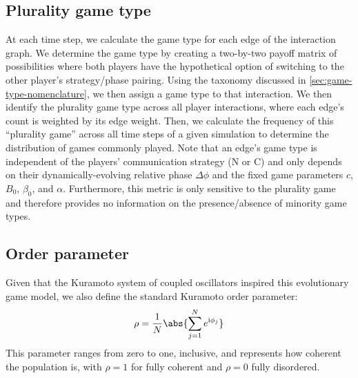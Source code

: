\documentclass[pdflatex,lineno,referee,sn-nature]{sn-jnl}
\begin{document}
\subsection{Plurality game type}\label{sec:plurality_game_type}
At each time step, we calculate the game type for each edge
of the interaction graph.
We determine the game type by creating a two-by-two payoff matrix of possibilities
where both players have the hypothetical option of switching to the other player's
strategy/phase pairing.
Using the taxonomy discussed in \cref{sec:game-type-nomenclature},
we then assign a game type to that interaction.
We then identify the plurality game type across all player interactions,
where each edge's count is weighted by its edge weight.
Then, we calculate the frequency of this ``plurality game'' across
all time steps of a given simulation to determine the distribution
of games commonly played.
Note that an edge's game type is independent
of the players' communication strategy (N or C) and only depends on
their dynamically-evolving relative phase $\Delta \phi$
and the fixed game parameters $c$, $B_0$, $\beta_0$, and $\alpha$.
Furthermore, this metric is only sensitive to the
plurality game and therefore provides no information
on the presence/absence of minority game types.

\subsection{Order parameter}
Given that the Kuramoto system of coupled oscillators
inspired this evolutionary game model,
we also define the standard Kuramoto order parameter:
\begin{equation}
  \rho = \frac{1}{N} \abs{\sum_{j=1}^N e^{\im \phi_j}}
  \label{eq:order_parameter}
\end{equation}
This parameter ranges from zero to one, inclusive,
and represents how coherent the population is,
with $\rho = 1$ for fully coherent and $\rho = 0$ fully disordered.
\end{document}
